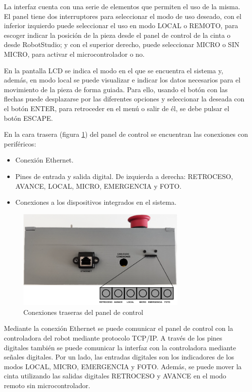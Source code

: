 La interfaz cuenta con una serie de elementos que permiten el uso de la misma. El panel tiene dos interruptores para seleccionar el modo de uso deseado, con el inferior izquierdo puede seleccionar el uso en modo LOCAL o REMOTO, para escoger indicar la posición de la pieza desde el panel de control de la cinta o desde RobotStudio; y con el superior derecho, puede seleccionar MICRO o SIN MICRO, para activar el microcontrolador o no.

En la pantalla LCD se indica el modo en el que se encuentra el sistema y, además, en modo local se puede visualizar e indicar los datos necesarios para el movimiento de la pieza de forma guiada. Para ello, usando el botón con las flechas puede desplazarse por las diferentes opciones y seleccionar la deseada con el botón ENTER, para retroceder en el menú o salir de él, se debe pulsar el botón ESCAPE.

En la cara trasera (figura \ref{fig:pinesdigitalesreal}) del panel de control se encuentran las conexiones con periféricos:
\begin{itemize}
    \item Conexión Ethernet.
    \item Pines de entrada y salida digital. De izquierda a derecha: RETROCESO, AVANCE, LOCAL, MICRO, EMERGENCIA y FOTO.
    \item Conexiones a los dispositivos integrados en el sistema.
\end{itemize}

    \begin{figure}[htbp]
        \centering
        \includegraphics[width=0.75\textwidth]{09-guiadeuso/DIGITALES_REAL.pdf}
        \caption{Conexiones traseras del panel de control}
        \label{fig:pinesdigitalesreal}
        \end{figure}

Mediante la conexión Ethernet se puede comunicar el panel de control con la controladora del robot mediante protocolo TCP/IP. A través de los pines digitales también se puede comunicar la interfaz con la controladora mediante señales digitales. Por un lado, las entradas digitales son los indicadores de los modos LOCAL, MICRO, EMERGENCIA y FOTO. Además, se puede mover la cinta utilizando las salidas digitales RETROCESO y AVANCE en el modo remoto sin microcontrolador.


